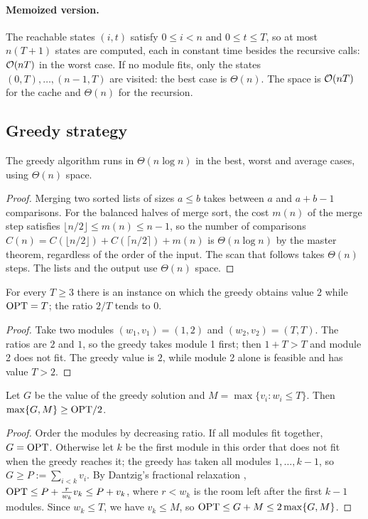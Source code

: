 \paragraph{Memoized version.} The reachable states $(i,t)$ satisfy $0\le i<n$ and $0\le t\le T$, so at most $n(T+1)$ states are computed, each in constant time besides the recursive calls: $\mathcal{O}(nT)$ in the worst case. If no module fits, only the states $(0,T),\dots,(n-1,T)$ are visited: the best case is $\Theta(n)$. The space is $\mathcal{O}(nT)$ for the cache and $\Theta(n)$ for the recursion.

\subsection{Greedy strategy}

\begin{proposition}\label{prop:greedy-time}
The greedy algorithm runs in $\Theta(n\log n)$ in the best, worst and average cases, using $\Theta(n)$ space.
\end{proposition}
\begin{proof}
Merging two sorted lists of sizes $a\le b$ takes between $a$ and $a+b-1$ comparisons. For the balanced halves of merge sort, the cost $m(n)$ of the merge step satisfies $\lfloor n/2\rfloor\le m(n)\le n-1$, so the number of comparisons $C(n)=C(\lfloor n/2\rfloor)+C(\lceil n/2\rceil)+m(n)$ is $\Theta(n\log n)$ by the master theorem, regardless of the order of the input. The scan that follows takes $\Theta(n)$ steps. The lists and the output use $\Theta(n)$ space.
\end{proof}

\begin{proposition}\label{prop:greedy-unbounded}
For every $T\ge3$ there is an instance on which the greedy obtains value $2$ while $\mathrm{OPT}=T$; the ratio $2/T$ tends to $0$.
\end{proposition}
\begin{proof}
Take two modules $(w_1,v_1)=(1,2)$ and $(w_2,v_2)=(T,T)$. The ratios are $2$ and $1$, so the greedy takes module 1 first; then $1+T>T$ and module 2 does not fit. The greedy value is $2$, while module 2 alone is feasible and has value $T>2$.
\end{proof}

\begin{proposition}\label{prop:greedy-half}
Let $G$ be the value of the greedy solution and $M=\max\{v_i: w_i\le T\}$. Then $\max\{G,M\}\ge\mathrm{OPT}/2$.
\end{proposition}
\begin{proof}
Order the modules by decreasing ratio. If all modules fit together, $G=\mathrm{OPT}$. Otherwise let $k$ be the first module in this order that does not fit when the greedy reaches it; the greedy has taken all modules $1,\dots,k-1$, so $G\ge P:=\sum_{i<k}v_i$. By Dantzig's fractional relaxation \cite{dantzig1957}, $\mathrm{OPT}\le P+\frac{r}{w_k}v_k\le P+v_k$, where $r<w_k$ is the room left after the first $k-1$ modules. Since $w_k\le T$, we have $v_k\le M$, so $\mathrm{OPT}\le G+M\le 2\max\{G,M\}$.
\end{proof}

